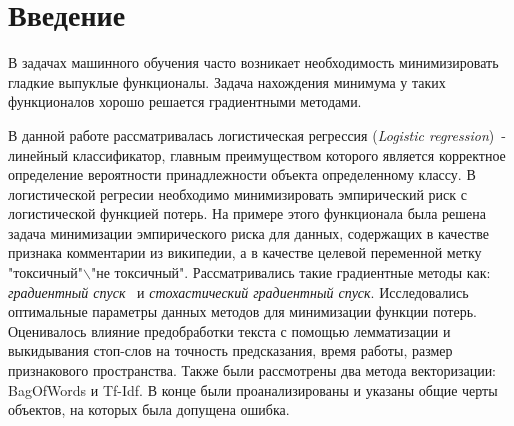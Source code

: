 \section{\huge Введение}
В задачах машинного обучения часто возникает необходимость минимизировать 
гладкие выпуклые функционалы. Задача нахождения минимума у таких функционалов
хорошо решается градиентными методами.

В данной работе рассматривалась
логистическая регрессия ({\itshape Logistic regression})~- линейный классификатор, 
главным преимуществом которого является корректное определение вероятности 
принадлежности объекта определенному классу. В логистической регресии необходимо 
минимизировать эмпирический риск с логистической функцией потерь.
На примере этого функционала была решена задача минимизации эмпирического 
риска для данных, содержащих в качестве признака комментарии из википедии, 
а в качестве целевой  переменной метку "токсичный"$\backslash$"не токсичный". Рассматривались 
такие градиентные методы как: {\itshape градиентный спуск} \ и {\itshape стохастический градиентный спуск}.
Исследовались оптимальные параметры данных методов для минимизации функции потерь. 
Оценивалось влияние предобработки текста с помощью лемматизации и выкидывания 
стоп-слов на точность предсказания, время работы, размер признакового пространства. 
Также были рассмотрены два метода векторизации: BagOfWords и Tf-Idf. В конце были 
проанализированы и указаны общие черты объектов, на которых была допущена ошибка.